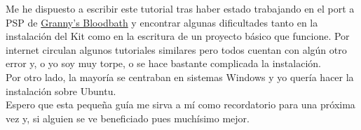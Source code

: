 Me he dispuesto a escribir este tutorial tras haber estado trabajando
en el port a PSP de \href{http://grannysbloodbath.wordpress.com}{Granny's Bloodbath}
y encontrar algunas dificultades tanto en la instalación del Kit como en
la escritura de un proyecto básico que funcione. Por internet circulan
algunos tutoriales similares pero todos cuentan con algún otro error y,
o yo soy muy torpe, o se hace bastante complicada la instalación.\\

Por otro lado, la mayoría se centraban en sistemas Windows y yo quería 
hacer la instalación sobre Ubuntu.\\

Espero que esta pequeña
guía me sirva a mí como recordatorio para una próxima vez y, si alguien
se ve beneficiado pues muchísimo mejor.\\
